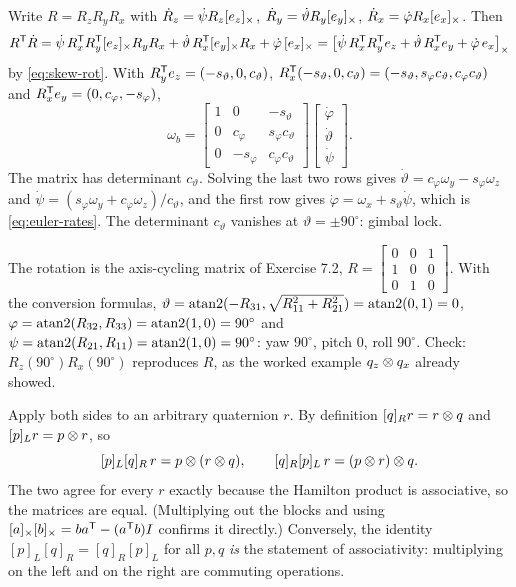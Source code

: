 \begin{solutions}
  \item Write $R = R_zR_yR_x$ with $\dot R_z = \dot\psi R_z[e_z]_{\times}$, $\dot R_y = \dot\vartheta R_y[e_y]_{\times}$, $\dot R_x = \dot\varphi R_x[e_x]_{\times}$. Then
        \[
          R^{\mathsf{T}}\dot R = \dot\psi\,R_x^{\mathsf{T}} R_y^{\mathsf{T}}[e_z]_{\times}R_yR_x + \dot\vartheta\,R_x^{\mathsf{T}}[e_y]_{\times}R_x + \dot\varphi\,[e_x]_{\times}
          = \big[\dot\psi\,R_x^{\mathsf{T}} R_y^{\mathsf{T}} e_z + \dot\vartheta\,R_x^{\mathsf{T}} e_y + \dot\varphi\,e_x\big]_\times
        \]
        by \eqref{eq:skew-rot}. With $R_y^{\mathsf{T}} e_z = (-s_\vartheta, 0, c_\vartheta)$, $R_x^{\mathsf{T}}(-s_\vartheta, 0, c_\vartheta) = (-s_\vartheta, s_\varphi c_\vartheta, c_\varphi c_\vartheta)$ and
        $R_x^{\mathsf{T}} e_y = (0, c_\varphi, -s_\varphi)$,
        \[
          \omega_b = \begin{bmatrix} 1 & 0 & -s_\vartheta \\ 0 & c_\varphi & s_\varphi c_\vartheta \\ 0 & -s_\varphi & c_\varphi c_\vartheta \end{bmatrix}
                     \begin{bmatrix}\dot\varphi\\ \dot\vartheta\\ \dot\psi\end{bmatrix}.
        \]
        The matrix has determinant $c_\vartheta$. Solving the last two rows gives $\dot\vartheta = c_\varphi\omega_y - s_\varphi\omega_z$ and
        $\dot\psi = (s_\varphi\omega_y + c_\varphi\omega_z)/c_\vartheta$, and the first row gives $\dot\varphi = \omega_x + s_\vartheta\dot\psi$, which is \eqref{eq:euler-rates}.
        The determinant $c_\vartheta$ vanishes at $\vartheta = \pm90^\circ$: gimbal lock.

  \item The rotation is the axis-cycling matrix of Exercise 7.2, $R = \begin{bmatrix}0 & 0 & 1\\ 1 & 0 & 0\\ 0 & 1 & 0\end{bmatrix}$. With the conversion formulas,
        $\vartheta = \operatorname{atan2}(-R_{31}, \sqrt{R_{11}^2 + R_{21}^2}) = \operatorname{atan2}(0, 1) = 0$, $\varphi = \operatorname{atan2}(R_{32}, R_{33}) = \operatorname{atan2}(1, 0) = 90^\circ$ and
        $\psi = \operatorname{atan2}(R_{21}, R_{11}) = \operatorname{atan2}(1, 0) = 90^\circ$: yaw $90^\circ$, pitch $0$, roll $90^\circ$. Check: $R_z(90^\circ)R_x(90^\circ)$ reproduces $R$, as the worked
        example $q_z\otimes q_x$ already showed.

  \item Apply both sides to an arbitrary quaternion $r$. By definition $[q]_Rr = r\otimes q$ and $[p]_Lr = p\otimes r$, so
        \[
          [p]_L[q]_R\,r = p\otimes(r\otimes q), \qquad [q]_R[p]_L\,r = (p\otimes r)\otimes q .
        \]
        The two agree for every $r$ exactly because the Hamilton product is associative, so the matrices are equal. (Multiplying out the blocks and
        using $[a]_{\times}[b]_{\times} = ba^{\mathsf{T}} - (a^{\mathsf{T}} b)I$ confirms it directly.) Conversely, the identity $[p]_L[q]_R = [q]_R[p]_L$ for all $p, q$ \emph{is} the
        statement of associativity: multiplying on the left and on the right are commuting operations.


\end{solutions}
